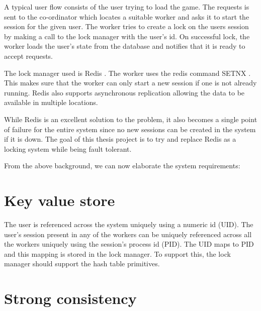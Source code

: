 A typical user flow consists of the user trying to load the game. The requests
is sent to the co-ordinator which locates a suitable worker and asks it to
start the session for the given user. The worker tries to create a lock on
the users session by making a call to the lock manager with the user's id.
On successful lock, the worker loads the user's state from the database and
notifies that it is ready to accept requests.

The lock manager used is Redis \citep{redis}%
. The worker uses the redis command SETNX%
. This makes sure that the worker can only start a new session if one is 
not already running. Redis also supports asynchronous replication allowing the 
data to be available in multiple locations.

While Redis is an excellent solution to the problem, it also becomes a single
point of failure for the entire system since no new sessions can be created in 
the system if it is down. The goal of this thesis project is to try and replace
Redis as a locking system while being fault tolerant.

From the above background, we can now elaborate the system requirements:

\section{Key value store}


The user is referenced across the system uniquely using a numeric id (UID). The 
user's session present in any of the workers can be uniquely referenced across 
all the workers uniquely using the session's process id (PID). The UID maps to
PID and this mapping is stored in the lock manager. To support this, the lock
manager should support the hash table primitives.

\section{Strong consistency}


